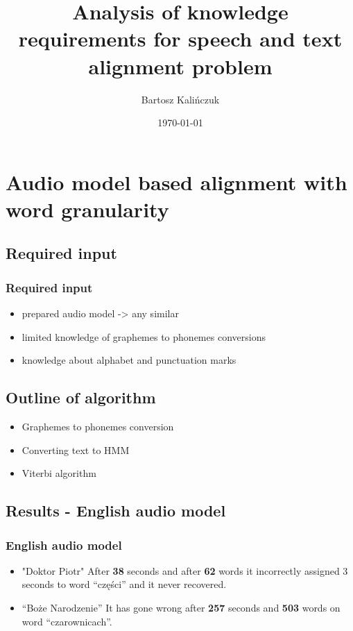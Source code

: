 \documentclass[]{beamer}
\title[Speech and text alignment]{Analysis of knowledge requirements for speech and text alignment problem}
\author{Bartosz Kalińczuk}
\date{\today}
\begin{document}
\begin{frame}
  \titlepage
\end{frame}

\section[Outline]{}

\begin{frame}
  \tableofcontents[hideallsubsections]
\end{frame}


\section{Audio model based alignment with word granularity}
\subsection{Required input}
\begin{frame}
    \frametitle{Required input}
    \begin{itemize}
        \item prepared audio model -> any similar
        \item limited knowledge of graphemes to phonemes conversions
        \item knowledge about alphabet and punctuation marks
    \end{itemize}
\end{frame}
\subsection{Outline of algorithm}
\begin{frame}
    \begin{itemize}
        \item Graphemes to phonemes conversion
        \item Converting text to HMM
        \item Viterbi algorithm
    \end{itemize}
\end{frame}
\subsection{Results - English audio model}
\begin{frame}
    \frametitle{English audio model}
    \begin{itemize}
        \item "Doktor Piotr" \newline
        After \textbf{38} seconds and after \textbf{62} words it incorrectly assigned 3 seconds to word “części” and it never recovered.
        \item  “Boże Narodzenie” \newline
        It has gone wrong after \textbf{257} seconds and \textbf{503} words on word “czarownicach”.
    \end{itemize}
\end{frame}
\end{document}
